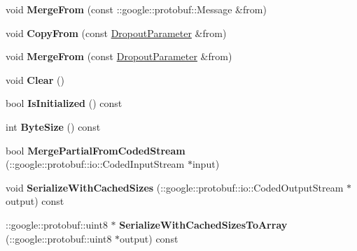 \begin{DoxyCompactItemize}
void {\bfseries Merge\+From} (const \+::google\+::protobuf\+::\+Message \&from)
\item 
\mbox{\label{classcaffe_1_1_dropout_parameter_ab1140711b3dff23d107b70f4c302fa18}} 
void {\bfseries Copy\+From} (const \mbox{\hyperlink{classcaffe_1_1_dropout_parameter}{Dropout\+Parameter}} \&from)
\item 
\mbox{\label{classcaffe_1_1_dropout_parameter_a9b1ed23462149b60e54d53fb2c14120b}} 
void {\bfseries Merge\+From} (const \mbox{\hyperlink{classcaffe_1_1_dropout_parameter}{Dropout\+Parameter}} \&from)
\item 
\mbox{\label{classcaffe_1_1_dropout_parameter_a5ceb8c4f3b1be5739621749b628bc886}} 
void {\bfseries Clear} ()
\item 
\mbox{\label{classcaffe_1_1_dropout_parameter_ad0028258058917fbb7e75bdd54e1044c}} 
bool {\bfseries Is\+Initialized} () const
\item 
\mbox{\label{classcaffe_1_1_dropout_parameter_a4763ffb1e7c060a147efe29aa695af60}} 
int {\bfseries Byte\+Size} () const
\item 
\mbox{\label{classcaffe_1_1_dropout_parameter_ab81924462ff71971ceecfd3923b848f6}} 
bool {\bfseries Merge\+Partial\+From\+Coded\+Stream} (\+::google\+::protobuf\+::io\+::\+Coded\+Input\+Stream $\ast$input)
\item 
\mbox{\label{classcaffe_1_1_dropout_parameter_a6235a397b63d76c2fb83113bb7bf463c}} 
void {\bfseries Serialize\+With\+Cached\+Sizes} (\+::google\+::protobuf\+::io\+::\+Coded\+Output\+Stream $\ast$output) const
\item 
\mbox{\label{classcaffe_1_1_dropout_parameter_a670ee06972ca53fa3a42b741a28fa369}} 
\+::google\+::protobuf\+::uint8 $\ast$ {\bfseries Serialize\+With\+Cached\+Sizes\+To\+Array} (\+::google\+::protobuf\+::uint8 $\ast$output) const
\item 
\mbox{\label{classcaffe_1_1_dropout_parameter_ae2fdd2f6b9d7a5d371864bd0ec8db014}} 

\end{DoxyCompactItemize}
